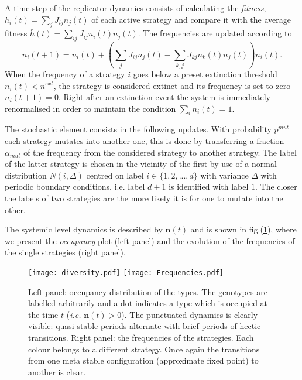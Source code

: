 \documentclass[12pt]{article}
\begin{document}
A time step of the replicator dynamics consists of calculating the \emph{fitness}, $h_i(t) =  \sum_j J_{ij}n_j(t) $ of each active strategy and compare it with the average fitness $\bar{h}(t)= \sum_{ij}J_{ij}n_{i}(t)n_{j}(t) $. The frequencies are  updated according to
\begin{equation}
n_{i}(t+1)= n_i(t)+\left( \sum_j J_{ij} n_j(t) - \sum_{k,j}J_{kj}n_{k}(t)n_{j}(t) \right) n_i(t).
\label{Eq:ReplicatorEq}
\end{equation}
When the frequency of a strategy $i$ goes below a preset extinction threshold $n_i(t)<n^{{ext}}$, the strategy is considered extinct and its frequency is set to zero $n_i(t+1) = 0$. Right after an extinction event the system is immediately renormalised in order to maintain the condition $\sum_i n_i(t) =1$.

The stochastic element consists in the following updates. With probability $p^{{mut}}$ each strategy mutates into another one, this is done by transferring a fraction $\alpha_{{mut}}$ of the frequency from the considered strategy to another strategy. The label of the latter strategy is chosen in the vicinity of the first by use of a normal distribution $N(i,\Delta)$ centred on label $i\in\{1,2,...,d\}$ with variance $\Delta$ with periodic boundary conditions, i.e. label $d+1$ is identified with label $1$. The closer the labels of two strategies are the more likely it is for one to mutate into the other.

The systemic level dynamics is described by $\textbf{n}(t)$ and is shown in fig.(\ref{fig:2}), where we present the \emph{occupancy} plot (left panel) and the evolution of the frequencies of the single strategies (right panel).

\begin{figure}[!h]
\centering
\texttt{[image: diversity.pdf]}
\texttt{[image: Frequencies.pdf]}
\caption{Left panel: occupancy distribution of the types. The genotypes are labelled arbitrarily and a dot indicates a type which is occupied at the time $t$ (\textit{i.e.} $\textbf{n}(t)>0$). The punctuated dynamics is clearly visible: quasi-stable periods alternate with brief periods of hectic transitions. Right panel: the frequencies of the strategies. Each colour belongs to a different strategy. Once again the transitions from one meta stable configuration (approximate fixed point) to another is clear.}
\label{fig:2}
\end{figure}
\end{document}
